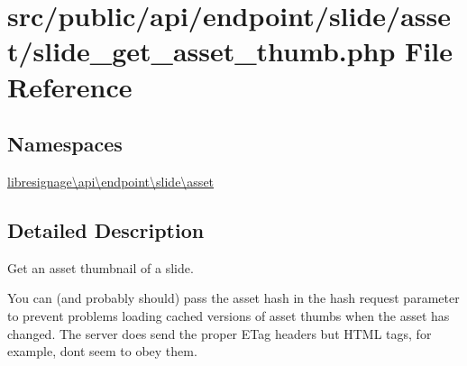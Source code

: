 \hypertarget{src_2public_2api_2endpoint_2slide_2asset_2slide__get__asset__thumb_8php}{}\section{src/public/api/endpoint/slide/asset/slide\+\_\+get\+\_\+asset\+\_\+thumb.php File Reference}
\label{src_2public_2api_2endpoint_2slide_2asset_2slide__get__asset__thumb_8php}
\subsection*{Namespaces}
\begin{DoxyCompactItemize}
\item 
 \hyperlink{namespacelibresignage_1_1api_1_1endpoint_1_1slide_1_1asset}{libresignage\textbackslash{}api\textbackslash{}endpoint\textbackslash{}slide\textbackslash{}asset}
\end{DoxyCompactItemize}


\subsection{Detailed Description}
Get an asset thumbnail of a slide.

You can (and probably should) pass the asset hash in the \textquotesingle{}hash\textquotesingle{} request parameter to prevent problems loading cached versions of asset thumbs when the asset has changed. The server does send the proper E\+Tag headers but H\+T\+ML  tags, for example, don\textquotesingle{}t seem to obey them.

